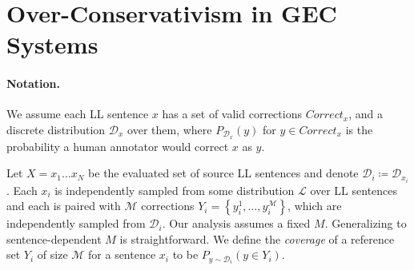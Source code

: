 \documentclass[letterpaper, 11pt]{article}
\begin{document}
%
%
%
%
\section{Over-Conservativism in GEC Systems}\label{sec:formal_conservatism}
%
%

\paragraph{Notation.}
We assume each LL sentence $x$ has a set of valid corrections $Correct_x$,
and a discrete distribution $\mathcal{D}_x$ over them, where $P_{\mathcal{D}_x}(y)$
for $y \in Correct_x$ is the probability a human annotator would correct $x$ as $y$.

Let $X=x_{1}\ldots x_{N}$ be the evaluated set of source LL sentences and denote $\mathcal{D}_{i}\coloneqq \mathcal{D}_{x_i}$. Each $x_{i}$ is independently sampled from some distribution $\mathcal{L}$ over LL sentences 
and each is paired with $\mathcal{M}$ corrections $Y_i = \left\{y_{i}^{1},\ldots, y_{i}^{\mathcal{M}}\right\}$,
which are independently sampled from $\mathcal{D}_{i}$. Our analysis assumes a fixed $M$. Generalizing to sentence-dependent $M$ is straightforward.
We define the {\it coverage} of a reference set $Y_i$ of size $\mathcal{M}$ for a sentence $x_i$ to be $P_{y \sim \mathcal{D}_i}(y \in Y_i)$.
\end{document}
